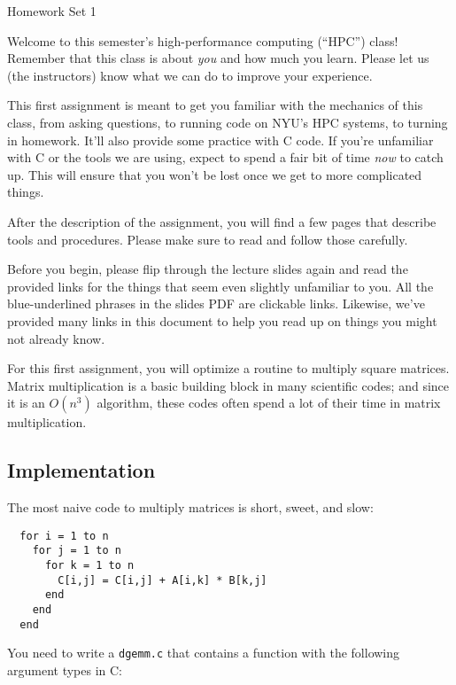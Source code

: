 \documentclass[11pt]{article}
\begin{document}
%
{Homework Set 1}

\smallskip
Welcome to this semester's high-performance computing (``HPC'') class!
Remember that this class is about \emph{you} and how much you learn.
Please let us (the instructors) know what we can do to improve your
experience.

\smallskip This first assignment is meant to get you familiar with the
mechanics of this class, from asking questions, to running code on
NYU's HPC systems, to turning in homework. It'll also provide some
practice with C code. If you're unfamiliar with C or the tools we are
using, expect to spend a fair bit of time \emph{now} to catch up. This
will ensure that you won't be lost once we get to more complicated
things.

\smallskip
After the description of the assignment, you will find a few pages
that describe tools and procedures. Please make sure to read and
follow those carefully.

\hrulefill

Before you begin, please flip through the lecture slides again and
read the provided links for the things that seem even slightly
unfamiliar to you. All the blue-underlined phrases in the slides PDF
are clickable links. Likewise, we've provided many links in this
document to help you read up on things you might not already know.
\smallskip

For this first assignment, you will optimize a routine to multiply
square matrices. Matrix multiplication is a basic building block in
many scientific codes; and since it is an $O(n^3)$ algorithm, these
codes often spend a lot of their time in matrix multiplication. 

\subsection*{Implementation}

The most naive code to multiply matrices is short, sweet, and slow:

\begin{lstlisting}
  for i = 1 to n
    for j = 1 to n
      for k = 1 to n
        C[i,j] = C[i,j] + A[i,k] * B[k,j]
      end
    end
  end
\end{lstlisting}

You need to write a \texttt{dgemm.c} that contains a function with the
following argument types in C:
\end{document}
